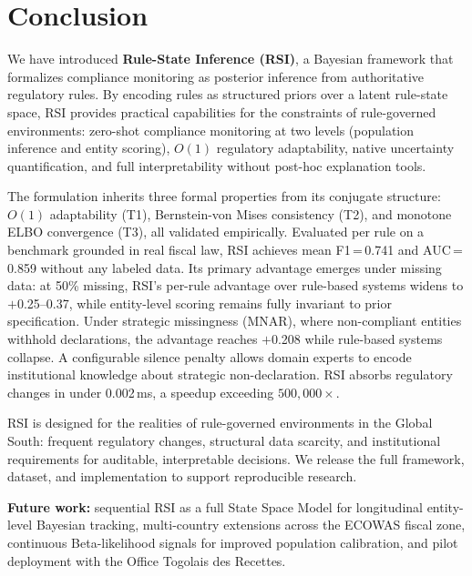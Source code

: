 \documentclass[letterpaper]{article}
\begin{document}
\section{Conclusion}
\label{sec:conclusion}

We have introduced \textbf{Rule-State Inference (RSI)}, a Bayesian
framework that formalizes compliance monitoring as posterior inference
from authoritative regulatory rules. By encoding rules as structured
priors over a latent rule-state space, RSI provides practical
capabilities for the constraints of rule-governed environments:
zero-shot compliance monitoring at two levels (population inference
and entity scoring), $O(1)$ regulatory adaptability, native
uncertainty quantification, and full interpretability without
post-hoc explanation tools.

The formulation inherits three formal properties from its conjugate
structure: $O(1)$ adaptability (T1), Bernstein-von Mises consistency
(T2), and monotone ELBO convergence (T3), all validated empirically.
Evaluated per rule on a benchmark grounded in real fiscal law, RSI
achieves mean F1\,=\,0.741 and AUC\,=\,0.859 without any labeled data.
Its primary advantage emerges under missing data: at 50\% missing,
RSI's per-rule advantage over rule-based systems widens to
$+$0.25--0.37, while entity-level scoring remains fully invariant to
prior specification. Under strategic missingness (MNAR), where
non-compliant entities withhold declarations, the advantage reaches
$+$0.208 while rule-based systems collapse. A configurable silence
penalty allows domain experts to encode institutional knowledge about
strategic non-declaration. RSI absorbs regulatory changes in under
0.002\,ms, a speedup exceeding $500{,}000\times$.

RSI is designed for the realities of rule-governed environments in the
Global South: frequent regulatory changes, structural data scarcity,
and institutional requirements for auditable, interpretable decisions.
We release the full framework, dataset, and implementation to support
reproducible research.

\medskip
\noindent\textbf{Future work:} sequential RSI as a full State Space
Model for longitudinal entity-level Bayesian tracking, multi-country
extensions across the ECOWAS fiscal zone, continuous Beta-likelihood
signals for improved population calibration, and pilot deployment
with the Office Togolais des Recettes.

\end{document}
